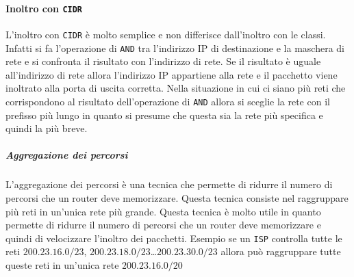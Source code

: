             \paragraph{Inoltro con \texttt{CIDR}} L'inoltro con \texttt{CIDR} è molto semplice e non differisce dall'inoltro con le classi. Infatti si fa l'operazione di \texttt{AND} tra l'indirizzo IP di destinazione e la maschera di rete e si confronta il risultato con l'indirizzo di rete. Se il risultato è uguale all'indirizzo di rete allora l'indirizzo IP appartiene alla rete e il pacchetto viene inoltrato alla porta di uscita corretta. Nella situazione in cui ci siano più reti che corrispondono al risultato dell'operazione di \texttt{AND} allora si sceglie la rete con il prefisso più lungo in quanto si presume che questa sia la rete più specifica e quindi la più breve.
            \subparagraph{Aggregazione dei percorsi} L'aggregazione dei percorsi è una tecnica che permette di ridurre il numero di percorsi che un router deve memorizzare. Questa tecnica consiste nel raggruppare più reti in un'unica rete più grande. Questa tecnica è molto utile in quanto permette di ridurre il numero di percorsi che un router deve memorizzare e quindi di velocizzare l'inoltro dei pacchetti. Esempio se un \texttt{ISP} controlla tutte le reti $200.23.16.0/23$, $200.23.18.0/23$\dots $200.23.30.0/23$ allora può raggruppare tutte queste reti in un'unica rete $200.23.16.0/20$